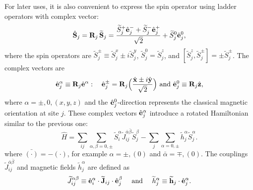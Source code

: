 For later uses, it is also convenient to express the spin operator using ladder operators with complex vector:
\begin{equation}\label{eq: Spin rotation-ladder}
    \hat{\bf S}_j = \mathbf{R}_j \, \widetilde{\mathbf{S}}_j
    = \frac{\widetilde{S}_{j}^{+} \hat{\bf e}^{-}_{j} + \widetilde{S}_{j}^{-} \hat{\bf e}^{+}_{j} }{\sqrt{2}} + \widetilde{S}^{0}_{j} \hat{\bf e}^{0}_{j},
\end{equation}
where the spin operators are $\widetilde{S}_{j}^{\pm} \equiv \widetilde{S}_{j}^{x} \pm i \widetilde{S}_{j}^{y}$, $\widetilde{S}^{0}_{j} = \widetilde{S}^{z}_{j}$, and $[\widetilde{S}^{z}_{j}, \widetilde{S}^{\pm}_{j}] = \pm \widetilde{S}^{\pm}_{j}$.
The complex vectors are
\begin{equation}
    \hat{\bf e}_{j}^{\alpha} \equiv \mathbf{R}_{j} \hat{\bf e}^{\alpha}: \quad 
    \hat{\bf e}^{\pm}_{j} = \mathbf{R}_{j} \Big( \frac{ \hat{\bf x} \pm i \hat{\bf y} }{\sqrt{2}} \Big)
    \text{ and }
    \hat{\bf e}_{j}^{0} \equiv \mathbf{R}_{j} \hat{\bf z},
\end{equation}
where $\alpha = \pm, 0, (x,y,z)$ and the $\hat{\bf e}_{j}^{0}$-direction represents the classical magnetic orientation at site $j$. 
These complex vectors $\hat{\bf e}_{j}^{\alpha}$ introduce a rotated Hamiltonian similar to the previous one:
\begin{equation}
    \hat{H} 
    = \sum_{ij} \sum_{\alpha, \beta = 0, \pm} 
    \widetilde{S}^{\alpha}_{i} \widetilde{J}^{\bar{\alpha}\bar{\beta}}_{ij} \widetilde{S}^{\beta}_{j} 
    - \sum_{j} \sum_{\alpha = 0, \pm} \widetilde{h}^{\alpha}_{j} \widetilde{S}^{\alpha}_{j}.
\end{equation}
where $\bar{(\cdot)} = - ( \cdot )$, for example $\alpha = \pm, (0)$ and $\bar{\alpha} = \mp, (0)$.
The couplings $\widetilde{J}^{\bar{\alpha}\bar{\beta}}_{ij}$ and magnetic fields $\widetilde{h}_{j}^{\alpha}$ are defined as 
\begin{equation}
    \widetilde{J}^{\alpha\beta}_{ij} \equiv \hat{\bf e}_{i}^{\alpha} \cdot \widetilde{\bf J}_{ij} \cdot \hat{\bf e}_{j}^{\beta}
    \quad \text{ and } \quad
    \widetilde{h}^{\alpha}_{j} \equiv \widetilde{\bf h}_{j} \cdot \hat{\bf e}^{\alpha}_{j}.
\end{equation}

